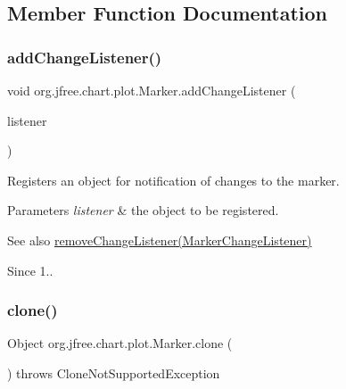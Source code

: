 \subsection{Member Function Documentation}
\mbox{\label{classorg_1_1jfree_1_1chart_1_1plot_1_1_marker_a8e820405ec8c80e7c4f4a4189823732d}} 
\subsubsection{\texorpdfstring{add\+Change\+Listener()}{addChangeListener()}}
{\footnotesize\ttfamily void org.\+jfree.\+chart.\+plot.\+Marker.\+add\+Change\+Listener (\begin{DoxyParamCaption}\item[{\mbox{\hyperlink{interfaceorg_1_1jfree_1_1chart_1_1event_1_1_marker_change_listener}{Marker\+Change\+Listener}}}]{listener }\end{DoxyParamCaption})}

Registers an object for notification of changes to the marker.


\begin{DoxyParams}{Parameters}
{\em listener} & the object to be registered.\\
\hline
\end{DoxyParams}
\begin{DoxySeeAlso}{See also}
\mbox{\hyperlink{classorg_1_1jfree_1_1chart_1_1plot_1_1_marker_a72e865426bd73ef0496079561882a93f}{remove\+Change\+Listener(\+Marker\+Change\+Listener)}}
\end{DoxySeeAlso}
\begin{DoxySince}{Since}
1.. 
\end{DoxySince}
\mbox{\label{classorg_1_1jfree_1_1chart_1_1plot_1_1_marker_a6ce06121b0881f318dced842cc1c32d7}} 
\subsubsection{\texorpdfstring{clone()}{clone()}}
{\footnotesize\ttfamily Object org.\+jfree.\+chart.\+plot.\+Marker.\+clone (\begin{DoxyParamCaption}{ }\end{DoxyParamCaption}) throws Clone\+Not\+Supported\+Exception}

